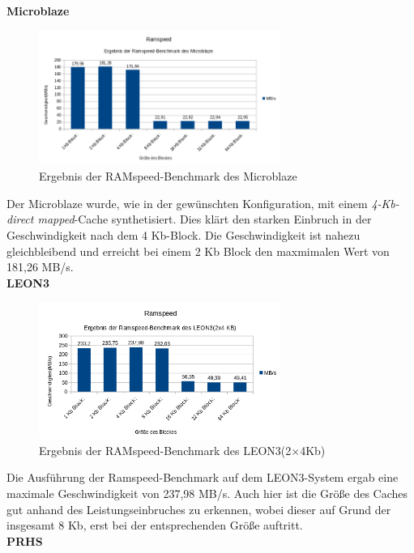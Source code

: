 \textbf{Microblaze}

\begin{figure}[H]
\centering
\includegraphics[width=0.7\textwidth]{Hauptteil/ramspeedmicroblaze.png}
\caption{Ergebnis der RAMspeed-Benchmark des Microblaze}
\label{fig:ramspeedmicroblaze}
\end{figure}

Der Microblaze wurde, wie in der gewünschten Konfiguration, mit einem \emph{4-Kb-direct mapped}-Cache synthetisiert. Dies klärt den starken Einbruch in der Geschwindigkeit nach dem 4 Kb-Block.
Die Geschwindigkeit ist nahezu gleichbleibend und erreicht bei einem 2 Kb Block den maxmimalen Wert von 181,26 MB/s.\\

\textbf{LEON3}

\begin{figure}[H]
\centering
\includegraphics[width=0.7\textwidth]{Hauptteil/ramspeedleon3.png}
\caption{Ergebnis der RAMspeed-Benchmark des LEON3(2\(\times\)4Kb)}
\label{fig:ramspeedleon3}
\end{figure}

Die Ausführung der Ramspeed-Benchmark auf dem LEON3-System ergab eine maximale Geschwindigkeit von 237,98 MB/s. Auch hier ist die Größe des Caches gut anhand des Leistungseinbruches zu erkennen,
wobei dieser auf Grund der insgesamt 8 Kb, erst bei der entsprechenden Größe auftritt.\\

\textbf{PRHS}

